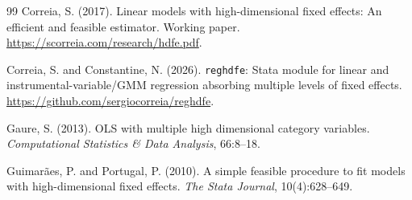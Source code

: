 \documentclass[11pt]{article}
\theoremstyle{definition}
\newcommand{\1}{\mathbf{1}}
\begin{document}
\begin{thebibliography}{99}
Correia, S. (2017). Linear models with high-dimensional fixed effects: An efficient and feasible estimator. Working paper. \url{https://scorreia.com/research/hdfe.pdf}.

Correia, S. and Constantine, N. (2026). \texttt{reghdfe}: Stata module for linear and instrumental-variable/GMM regression absorbing multiple levels of fixed effects. \url{https://github.com/sergiocorreia/reghdfe}.

Gaure, S. (2013). OLS with multiple high dimensional category variables. \emph{Computational Statistics \& Data Analysis}, 66:8--18.

Guimar\~aes, P. and Portugal, P. (2010). A simple feasible procedure to fit models with high-dimensional fixed effects. \emph{The Stata Journal}, 10(4):628--649.
\end{thebibliography}
\end{document}
